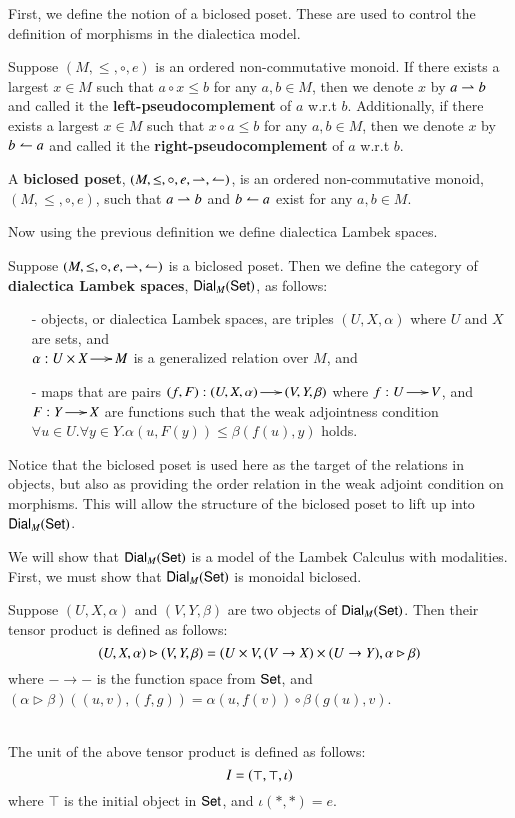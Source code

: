 First, we define the notion of a biclosed poset.  These are used to
control the definition of morphisms in the dialectica model.
\begin{definition}
  \label{def:biclosed-poset}
  Suppose $(M, \leq, \circ, e)$ is an ordered non-commutative monoid.
  If there exists a largest $x \in M$ such that $a \circ x \leq b$ for
  any $a, b \in M$, then we denote $x$ by $a \lto b$ and called it
  the \textbf{left-pseudocomplement} of $a$ w.r.t $b$.  Additionally,
  if there exists a largest $x \in M$ such that $x \circ a \leq b$ for
  any $a, b \in M$, then we denote $x$ by $b \rto a$ and called it
  the \textbf{right-pseudocomplement} of $a$ w.r.t $b$.

  A \textbf{biclosed poset}, $(M, \leq, \circ, e, \lto, \rto)$, is an
  ordered non-commutative monoid, $(M, \leq, \circ, e)$, such that $a
  \lto b$ and $b \rto a$ exist for any $a,b \in M$.
\end{definition}
Now using the previous definition we define dialectica Lambek spaces.
\begin{definition}
  \label{def:dialectica-lambek-spaces}
  Suppose $(M, \leq, \circ, e, \lto, \rto)$ is a biclosed poset. Then
  we define the category of \textbf{dialectica Lambek spaces},
  $\mathsf{Dial}_M(\Set)$, as follows:
  \begin{itemize}
  \item[-] objects, or dialectica Lambek spaces, are triples $(U, X,
    \alpha)$ where $U$ and $X$ are sets, and \\
    $\alpha : U \times X \mto M$ is a generalized relation over $M$, and
  \item[-] maps that are pairs $(f, F) : (U , X, \alpha) \mto (V , Y ,
    \beta)$ where $f : U \mto V$, and $F : Y \mto X$ are functions
    such that the weak adjointness condition
    $\forall u \in U.\forall y \in Y. \alpha(u , F(y)) \leq \beta(f(u), y)$
    holds.
  \end{itemize}
\end{definition}
Notice that the biclosed poset is used here as the target of the
relations in objects, but also as providing the order  relation in the weak adjoint condition on morphisms.  This will allow the structure of the biclosed
poset to lift up into $\Dial{M}{\Set}$.

We will show that $\Dial{M}{\Set}$ is a model of the Lambek Calculus
with modalities.  First, we must show that $\Dial{M}{\Set}$ is
monoidal biclosed.
\begin{definition}
  \label{def:dial-monoidal-structure}
  Suppose $(U, X, \alpha)$ and $(V, Y, \beta)$ are two objects of
  $\Dial{M}{\Set}$. Then their tensor product is defined as follows:
  \[ \small
  (U, X, \alpha) \rhd (V, Y, \beta) = (U \times V, (V \to X) \times (U \to Y), \alpha \rhd \beta)
  \]
  where $- \to -$ is the function space from $\Set$, and $(\alpha
  \rhd \beta)((u, v), (f, g)) = \alpha(u, f(v)) \circ \beta(g(u), v)$.

  \ \\
  \noindent
  The unit of the above tensor product is defined as follows:
  \[ \small
  I = (\top , \top , \iota)
  \]
  where $\top$ is the initial object in $\Set$, and $\iota(*,*) = e$.
\end{definition}


